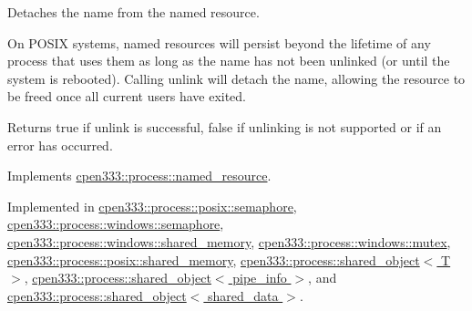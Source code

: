 Detaches the name from the named resource. 

On P\+O\+S\+IX systems, named resources will persist beyond the lifetime of any process that uses them as long as the name has not been unlinked (or until the system is rebooted). Calling {\ttfamily unlink} will detach the name, allowing the resource to be freed once all current users have exited.

\begin{DoxyReturn}{Returns}
{\ttfamily true} if unlink is successful, {\ttfamily false} if unlinking is not supported or if an error has occurred. 
\end{DoxyReturn}


Implements \hyperlink{classcpen333_1_1process_1_1named__resource_a5d33168fee48c9b0c58ab8fd96e230ce}{cpen333\+::process\+::named\+\_\+resource}.



Implemented in \hyperlink{classcpen333_1_1process_1_1posix_1_1semaphore_aa6064e2c4b4b7282cc5e6eda877ee1bb}{cpen333\+::process\+::posix\+::semaphore}, \hyperlink{classcpen333_1_1process_1_1windows_1_1semaphore_abc5159f32e61024c6c6a978ac64fe39d}{cpen333\+::process\+::windows\+::semaphore}, \hyperlink{classcpen333_1_1process_1_1windows_1_1shared__memory_aa6efdc9a3e1310ea69ecc48aeb41286c}{cpen333\+::process\+::windows\+::shared\+\_\+memory}, \hyperlink{classcpen333_1_1process_1_1windows_1_1mutex_aa45381a0a226fbefc86eef8971a5431b}{cpen333\+::process\+::windows\+::mutex}, \hyperlink{classcpen333_1_1process_1_1posix_1_1shared__memory_a3b6d67a41cfaca3712d87958682d8bbe}{cpen333\+::process\+::posix\+::shared\+\_\+memory}, \hyperlink{classcpen333_1_1process_1_1shared__object_aa5b43829da5bd2376927e6285745211c}{cpen333\+::process\+::shared\+\_\+object$<$ T $>$}, \hyperlink{classcpen333_1_1process_1_1shared__object_aa5b43829da5bd2376927e6285745211c}{cpen333\+::process\+::shared\+\_\+object$<$ pipe\+\_\+info $>$}, and \hyperlink{classcpen333_1_1process_1_1shared__object_aa5b43829da5bd2376927e6285745211c}{cpen333\+::process\+::shared\+\_\+object$<$ shared\+\_\+data $>$}.

\mbox{\label{classcpen333_1_1process_1_1impl_1_1named__resource__base_a47a1396cf7c8210e76431a4ba4725146}} 

